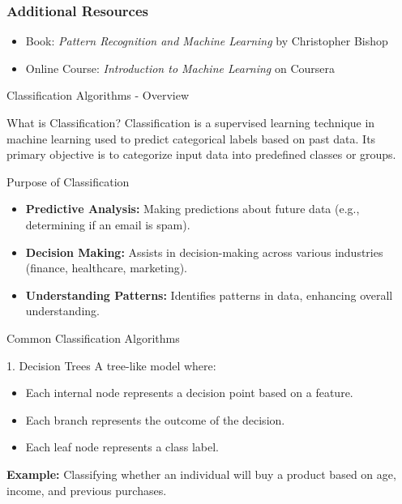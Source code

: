 \documentclass[aspectratio=169]{beamer}
\begin{document}
\begin{frame}[fragile]
    \frametitle{Additional Resources}
    \begin{itemize}
        \item Book: \textit{Pattern Recognition and Machine Learning} by Christopher Bishop
        \item Online Course: \textit{Introduction to Machine Learning} on Coursera
    \end{itemize}
\end{frame}

\begin{frame}[fragile]{Classification Algorithms - Overview}
    \begin{block}{What is Classification?}
        Classification is a supervised learning technique in machine learning used to predict categorical labels based on past data. 
        Its primary objective is to categorize input data into predefined classes or groups.
    \end{block}
\end{frame}

\begin{frame}[fragile]{Purpose of Classification}
    \begin{itemize}
        \item \textbf{Predictive Analysis:} Making predictions about future data (e.g., determining if an email is spam).
        \item \textbf{Decision Making:} Assists in decision-making across various industries (finance, healthcare, marketing).
        \item \textbf{Understanding Patterns:} Identifies patterns in data, enhancing overall understanding.
    \end{itemize}
\end{frame}

\begin{frame}[fragile]{Common Classification Algorithms}
    \begin{block}{1. Decision Trees}
        A tree-like model where:
        \begin{itemize}
            \item Each internal node represents a decision point based on a feature.
            \item Each branch represents the outcome of the decision.
            \item Each leaf node represents a class label.
        \end{itemize}
        \textbf{Example:} Classifying whether an individual will buy a product based on age, income, and previous purchases.
    \end{block}
\end{frame}
\end{document}

